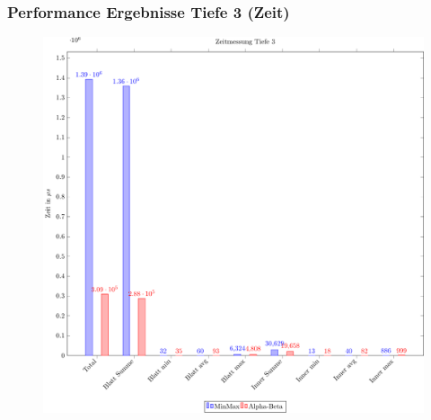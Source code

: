 \documentclass{beamer}
\begin{document}
\begin{frame}
\frametitle{Performance Ergebnisse Tiefe 3 (Zeit)}
  \begin{figure}
    \centering
    \includegraphics[scale=0.4]{figures/time-3.pdf}
  \end{figure}

\end{frame}

\end{document}
